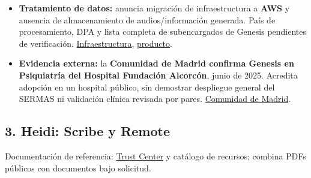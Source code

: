 \begin{itemize}
\item \textbf{Tratamiento de datos:} anuncia migración de infraestructura a \textbf{AWS} y ausencia de almacenamiento de audios/\allowbreak{}información generada. País de procesamiento, DPA y lista completa de subencargados de Genesis pendientes de verificación. \href{https://www.invoxmedical.com/blog/migramos-a-aws-para-reforzar-la-seguridad-y-escalabilidad-de-nuestra-infraestructura-tecnologica}{Infraestructura}, \href{https://www.invoxmedical.com/}{producto}.
\item \textbf{Evidencia externa:} la \textbf{Comunidad de Madrid confirma Genesis en Psiquiatría del Hospital Fundación Alcorcón}, junio de 2025. Acredita adopción en un hospital público, sin demostrar despliegue general del SERMAS ni validación clínica revisada por pares. \href{https://www.comunidad.madrid/noticias/2025/06/10/hospital-publico-fundacion-alcorcon-incorpora-aplicacion-ia-optimizar-generacion-documentacion-clinica-partir-entrevistas}{Comunidad de Madrid}.
\end{itemize}

\subsection*{3. Heidi: Scribe y Remote}
\label{provider:3}

Documentación de referencia: \href{https://trust.heidihealth.com/}{Trust Center} y catálogo de recursos; combina PDFs públicos con documentos bajo solicitud.

